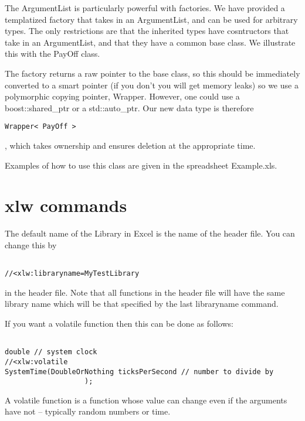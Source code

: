 \documentclass[12pt,reqno]{amsart}
\numberwithin{equation}{section}
\numberwithin{figure}{section}
\begin{document}
The ArgumentList is particularly powerful with factories. We have
 provided a templatized factory that takes in an ArgumentList, and can be
 used for arbitrary types. The only restrictions are that the
 inherited types have cosntructors that take in an ArgumentList, and
 that they have a common base class.  
 We illustrate this with the PayOff class. 

The factory returns a raw pointer to the base class, so this should be
immediately converted to a smart pointer (if you don't you will get
memory leaks) so we use a polymorphic copying pointer,
Wrapper. However, one could use a boost::shared\_ptr or a
std::auto\_ptr. Our new data type is therefore 

\begin{verbatim}
Wrapper< PayOff >
\end{verbatim}

, which takes ownership and ensures deletion at the appropriate time. 

Examples of how to use this class are given in the spreadsheet
Example.xls.

\section{xlw commands}

The default name of the Library in Excel is the name of the header
file. You can change this by

\begin{verbatim}

//<xlw:libraryname=MyTestLibrary

\end{verbatim}

in the header file. Note that all functions in the header file will have
the same library name which will be that specified by the last
libraryname command. 

If you want a volatile function then this can be done as follows:

\begin{verbatim}

double // system clock
//<xlw:volatile    
SystemTime(DoubleOrNothing ticksPerSecond // number to divide by
                   );

\end{verbatim}

A volatile function is a function whose value can change even if the
arguments have not -- typically random numbers or time. 
\end{document}
